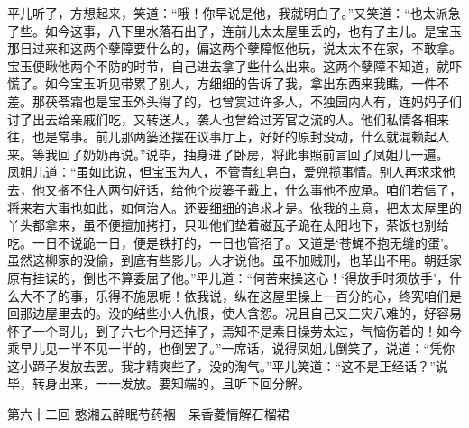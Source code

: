 \documentclass[12pt,oneside]{book}
\begin{document}
平儿听了，方想起来，笑道：“哦！你早说是他，我就明白了。”又笑道：“也太派急了些。如今这事，八下里水落石出了，连前儿太太屋里丢的，也有了主儿。是宝玉那日过来和这两个孽障要什么的，偏这两个孽障怄他玩，说太太不在家，不敢拿。宝玉便瞅他两个不防的时节，自己进去拿了些什么出来。这两个孽障不知道，就吓慌了。如今宝玉听见带累了别人，方细细的告诉了我，拿出东西来我瞧，一件不差。那茯苓霜也是宝玉外头得了的，也曾赏过许多人，不独园内人有，连妈妈子们讨了出去给亲戚们吃，又转送人，袭人也曾给过芳官之流的人。他们私情各相来往，也是常事。前儿那两篓还摆在议事厅上，好好的原封没动，什么就混赖起人来。等我回了奶奶再说。”说毕，抽身进了卧房，将此事照前言回了凤姐儿一遍。
凤姐儿道：“虽如此说，但宝玉为人，不管青红皂白，爱兜揽事情。别人再求求他去，他又搁不住人两句好话，给他个炭篓子戴上，什么事他不应承。咱们若信了，将来若大事也如此，如何治人。还要细细的追求才是。依我的主意，把太太屋里的丫头都拿来，虽不便擅加拷打，只叫他们垫着磁瓦子跪在太阳地下，茶饭也别给吃。一日不说跪一日，便是铁打的，一日也管招了。又道是‘苍蝇不抱无缝的蛋’。虽然这柳家的没偷，到底有些影儿。人才说他。虽不加贼刑，也革出不用。朝廷家原有挂误的，倒也不算委屈了他。”平儿道：“何苦来操这心！‘得放手时须放手’，什么大不了的事，乐得不施恩呢！依我说，纵在这屋里操上一百分的心，终究咱们是回那边屋里去的。没的结些小人仇恨，使人含怨。况且自己又三灾八难的，好容易怀了一个哥儿，到了六七个月还掉了，焉知不是素日操劳太过，气恼伤着的！如今乘早儿见一半不见一半的，也倒罢了。”一席话，说得凤姐儿倒笑了，说道：“凭你这小蹄子发放去罢。我才精爽些了，没的淘气。”平儿笑道：“这不是正经话？”说毕，转身出来，一一发放。要知端的，且听下回分解。

 
第六十二回  憨湘云醉眠芍药裀　呆香菱情解石榴裙
\end{document}
